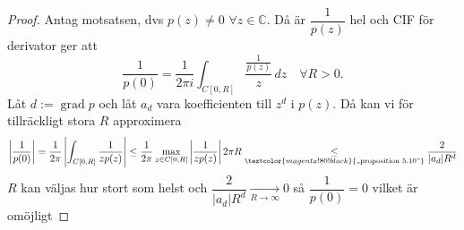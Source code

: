 \begin{proof}
Antag motsatsen, dvs $p(z) \neq 0$ $\forall z \in \mathbb{C}$.
Då är $\dfrac{1}{p(z)}$ hel och CIF för derivator ger att
\[ \frac{1}{p(0)} = \frac{1}{2\pi i}\int_{C[0, R]} \frac{\frac{1}{p(z)}}{z}\,dz \quad \forall R > 0. \]
Låt $d := \operatorname{grad} p$ och låt $a_d$ vara koefficienten till $z^d$ i $p(z)$. Då kan vi för tillräckligt stora $R$ approximera
\[ \left| \frac{1}{p(0)} \right| = \frac{1}{2\pi}\left| \int_{C[0, R]} \frac{1}{zp(z)} \right| \le \frac{1}{2\pi}\max_{z \in C[0, R]} \left| \frac{1}{zp(z)} \right| 2\pi R \underset{\textcolor{magenta!80!black}{\text{,,proposition 5.10''}}}{\le} \frac{2}{|a_d|R^d} \]
$R$ kan väljas hur stort som helst och $\dfrac{2}{|a_d|R^d} \xrightarrow[R \to \infty]{} 0$ så
$\dfrac{1}{p(0)} = 0$ vilket är omöjligt
\end{proof}
